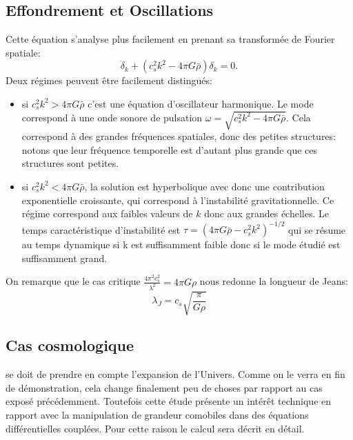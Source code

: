  \subsection{Effondrement et Oscillations}
 Cette équation s'analyse plus facilement en prenant sa transformée de Fourier spatiale:
 \begin{equation}
 \ddot \delta_k +(c_s^2k ^2-4\pi G \bar \rho) \delta_k= 0.
 \end{equation}
 Deux régimes peuvent être facilement distingués:
 \begin{itemize}
 \item si $c_s^2 k^2> 4\pi G \bar \rho$ c'est une équation d'oscillateur harmonique. Le mode correspond à une onde sonore de pulsation $\omega=\sqrt{c_s^2 k^2-4\pi G \bar \rho}$. Cela correspond à des grandes fréquences spatiales, donc des petites structures: notons que leur fréquence temporelle est d'autant plus grande que ces structures sont petites.
 \item si $c_s^2 k^2< 4\pi G \bar \rho$, la solution est hyperbolique avec donc une contribution exponentielle croissante, qui correspond à l'instabilité gravitationnelle. Ce régime correspond aux faibles valeurs de $k$ donc aux grandes échelles. Le temps caractéristique d'instabilité est $\tau = (4\pi G \bar \rho - c_s^2k^2)^{-1/2}$ qui se résume au temps dynamique si k est suffisamment faible donc si le mode étudié est suffisamment grand. 
 \end{itemize}
 
 On remarque que le cas critique $\frac{4\pi^2c_s^2}{\lambda^2}=4\pi G \rho$ nous redonne la longueur de Jeans:
 \begin{equation}
 \lambda_J=c_s\sqrt{\frac{\pi}{G\rho}}
 \end{equation}
 
 \subsection{Cas cosmologique}
 se doit de prendre en compte l'expansion de l'Univers. Comme on le verra en fin de démonstration, cela change finalement peu de choses par rapport au cas exposé précédemment. Toutefois cette étude présente un intérêt technique en rapport avec la manipulation de grandeur comobiles dans des équations différentielles couplées. Pour cette raison le calcul sera décrit en détail.


